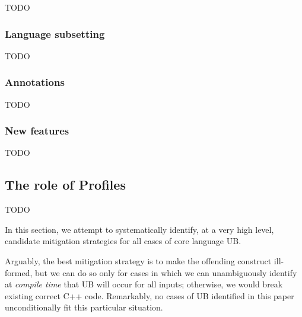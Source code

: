 TODO

\subsubsection{Language subsetting}
\label{subsetting}

TODO


\subsubsection{Annotations}
\label{annotations}

TODO

\subsubsection{New features}
\label{newfeatures}

TODO

\subsection{The role of Profiles}
\label{profiles}

TODO


In this section, we attempt to systematically identify, at a very high level, candidate mitigation strategies for all cases of core language UB.


Arguably, the best mitigation strategy is to make the offending construct ill-formed, but we can do so only for cases in which we can unambiguously identify at \emph{compile time} that UB will occur for all inputs; otherwise, we would break existing correct C++ code. Remarkably, no cases of UB identified in this paper unconditionally fit this particular situation.

